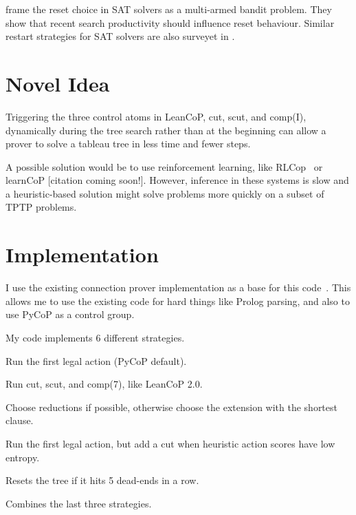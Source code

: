 \documentclass[11pt,twocolumn]{article}
\newcommand{\atom}[1]{\colorbox{Gray!30}{\ttfamily #1}}
\newcommand{\citen}[1]{~\parencite{#1}}
\newcommand{\citeay}[1]{\textcite{#1}}
\begin{document}
\citeay{liReinforcementLearningBased2024} frame the reset choice in SAT solvers as a multi-armed bandit problem.
They show that recent search productivity should influence reset behaviour.
Similar restart strategies for SAT solvers are also surveyet in \citeay{HoldenSATQSAT}.

\section{Novel Idea}

Triggering the three control atoms in LeanCoP, \atom{cut}, \atom{scut}, and \atom{comp(I)}, dynamically during the tree search rather than at the beginning can allow a prover to solve a tableau tree in less time and fewer steps.

A possible solution would be to use reinforcement learning, like RLCop\citen{Kaliszyk2018RLTP} or learnCoP [{\scriptsize citation coming soon!}].
However, inference in these systems is slow and a heuristic-based solution might solve problems more quickly on a subset of TPTP problems.

\section{Implementation}

I use the existing connection prover implementation as a base for this code\citen{connections_2023}.
This allows me to use the existing code for hard things like Prolog parsing, and also to use PyCoP as a control group.

My code implements 6 different strategies.
\begin{description}[style=nextline, itemsep=-3pt, leftmargin=16pt]
	\item[FirstAction \emph{\mdseries (control)}] Run the first legal action (PyCoP default).
	\item[LeanCoPCut \emph{\mdseries (control)}] Run \atom{cut}, \atom{scut}, and \atom{comp(7)}, like LeanCoP 2.0.
	\item[HeuristicSelection] Choose reductions if possible, otherwise choose the extension with the shortest clause.
	\item[EntropyCut] Run the first legal action, but add a cut when heuristic action scores have low entropy.
	\item[AdaptiveReset] Resets the tree if it hits 5 dead-ends in a row.
	\item[SmartCut] Combines the last three strategies.
\end{description}
\end{document}
